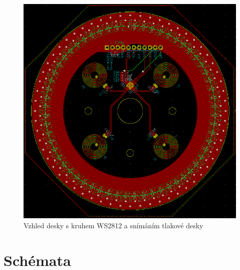 \begin{figure}
    \centering
    \includegraphics[width=\textwidth]{kapitoly/obrazky/E4/elektronika_tlakove_desky/leddeska-KiCad.png}
    \caption{Vzhled desky s kruhem WS2812 a snímáním tlakové desky}
    \label{fig:E4-LedDeska}
\end{figure}

\section{Schémata}

